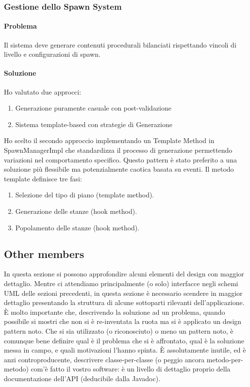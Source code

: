 \documentclass[a4paper,12pt]{report}
\begin{document}
\subsubsection{Gestione dello Spawn System}

\paragraph{Problema} Il sistema deve generare contenuti procedurali bilanciati rispettando vincoli di livello e configurazioni di spawn.

\paragraph{Soluzione} Ho valutato due approcci:
\begin{enumerate}
	\item Generazione puramente casuale con post-validazione
	\item Sistema template-based con strategie di Generazione
\end{enumerate}

Ho scelto il secondo approccio implementando un Template Method in SpawnManagerImpl che standardizza il processo di generazione permettendo variazioni nel comportamento specifico. Questo pattern è stato preferito a una soluzione più flessibile ma potenzialmente caotica basata su eventi.
Il metodo template definisce tre fasi:
\begin{enumerate}
	\item Selezione del tipo di piano (template method).
	\item Generazione delle stanze (hook method).
	\item Popolamento delle stanze (hook method).
\end{enumerate}

\subsection{Other members}

In questa sezione si possono approfondire alcuni elementi del design con maggior dettaglio.
%
Mentre ci attendiamo principalmente (o solo) interfacce negli schemi UML delle sezioni precedenti,
in questa sezione è necessario scendere in maggior dettaglio presentando la struttura di alcune sottoparti rilevanti dell'applicazione.
%
È molto importante che, descrivendo la soluzione ad un problema, quando possibile si mostri che non si è re-inventata la ruota ma si è applicato un design pattern noto.
%
Che si sia utilizzato (o riconosciuto) o meno un pattern noto, è comunque bene definire qual è il problema che si è affrontato, qual è la soluzione messa in campo, e quali motivazioni l'hanno spinta.
%
È assolutamente inutile, ed è anzi controproducente, descrivere classe-per-classe (o peggio ancora metodo-per-metodo) com'è fatto il vostro software: è un livello di dettaglio proprio della documentazione dell'API (deducibile dalla Javadoc).
\end{document}
